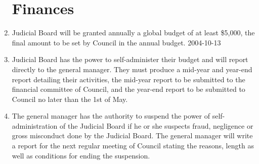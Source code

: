 \documentclass[oneside]{book}
\begin{document}
\begin{enumerate}
\section{\label{JB_finances}Finances}
\item Judicial Board will be granted annually a global budget of at least
\$5,000, the final amount to be set by Council in the annual budget.
2004-10-13 
\item Judicial Board has the power to self-administer their budget and will
report directly to the general manager. They must produce a mid-year
and year-end report detailing their activities, the mid-year report to be submitted
to the financial committee of Council, and the year-end report to be submitted to 
Council no later than the 1st of May. 
\item The general manager has the authority to suspend the power of self-administration
of the Judicial Board if he or she suspects fraud, negligence or gross
misconduct done by the Judicial Board. The general manager will write a report for the next regular meeting
of Council stating the reasons, length as well as conditions for ending
the suspension.

\end{enumerate}
\end{document}
